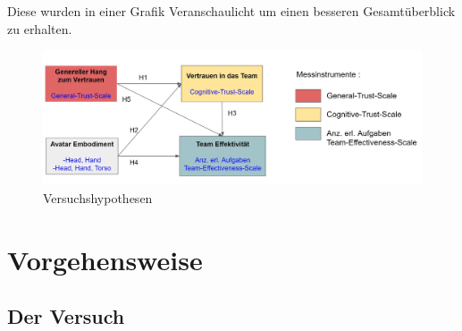 \documentclass[a4paper,11pt]{article}%
\renewcommand{\\}{\vspace*{0.5\baselineskip} \newline}
\begin{document}
%


Diese wurden in einer Grafik Veranschaulicht um einen besseren Gesamtüberblick zu erhalten.

\begin{figure}[H]
		\begin{footnotesize}
			\includegraphics[width=\textwidth]{Abbildungen/Versuchshypothesen.JPG}\\
			\caption{Versuchshypothesen}
			\label{Versuchshypothesen}
		\end{footnotesize}
	\end{figure}	

		
	\section{Vorgehensweise}
	\subsection{Der Versuch}
\end{document}
